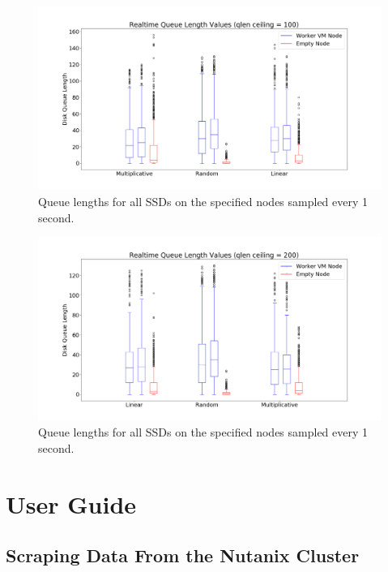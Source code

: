 \documentclass[12pt]{article}
\begin{document}
  \begin{figure}[!htb]
    \centering
    \includegraphics[scale=0.32]{images/qlen_100_box.png} 
    \caption{Queue lengths for all SSDs on the specified nodes sampled every 1
             second.}
    \label{fig:qlen_100}
  \end{figure}

  \begin{figure}[!htb]
    \centering
    \includegraphics[scale=0.32]{images/qlen_200_box.png} 
    \caption{Queue lengths for all SSDs on the specified nodes sampled every 1
             second.}
    \label{fig:qlen_200}
  \end{figure}

\section{User Guide}

  \subsection{Scraping Data From the Nutanix Cluster}
\end{document}
